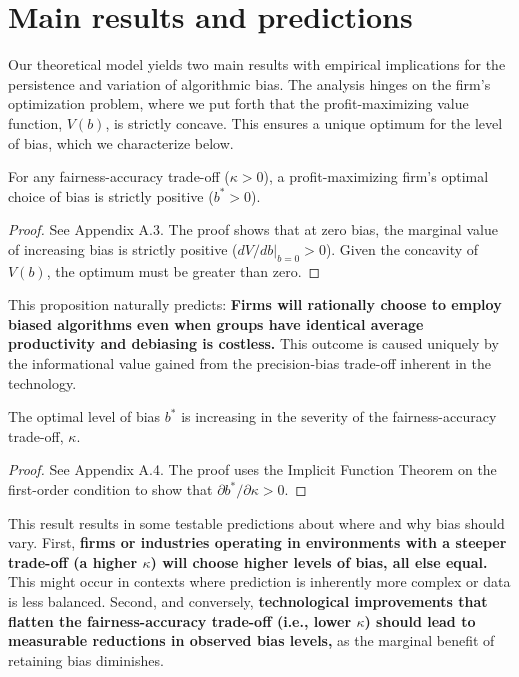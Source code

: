 \section{Main results and predictions}

Our theoretical model yields two main results with empirical implications for the persistence and variation of algorithmic bias. The analysis hinges on the firm's optimization problem, where we put forth that the profit-maximizing value function, $V(b)$, is strictly concave. This ensures a unique optimum for the level of bias, which we characterize below.

\begin{proposition}
    \label{prop:existence}
    For any fairness-accuracy trade-off ($\kappa > 0$), a profit-maximizing firm's optimal choice of bias is strictly positive ($b^* > 0$).
    \end{proposition}
    \begin{proof}
    See Appendix A.3. The proof shows that at zero bias, the marginal value of increasing bias is strictly positive ($dV/db|_{b=0} > 0$). Given the concavity of $V(b)$, the optimum must be greater than zero.
    \end{proof}
    
    This proposition naturally predicts: \textbf{Firms will rationally choose to employ biased algorithms even when groups have identical average productivity and debiasing is costless.} This outcome is caused uniquely by the informational value gained from the precision-bias trade-off inherent in the technology.


    \begin{proposition}
        \label{prop:comparative_static}
        The optimal level of bias $b^*$ is increasing in the severity of the fairness-accuracy trade-off, $\kappa$.
        \end{proposition}
        \begin{proof}
        See Appendix A.4. The proof uses the Implicit Function Theorem on the first-order condition to show that $\partial b^*/\partial\kappa > 0$.
        \end{proof}
        
        This result results in some testable predictions about where and why bias should vary. 
        First, \textbf{firms or industries operating in environments with a steeper trade-off (a higher $\kappa$) will choose higher levels of bias, all else equal.} This might occur in contexts where prediction is inherently more complex or data is less balanced.
        Second, and conversely, \textbf{technological improvements that flatten the fairness-accuracy trade-off (i.e., lower $\kappa$) should lead to measurable reductions in observed bias levels,} as the marginal benefit of retaining bias diminishes.

